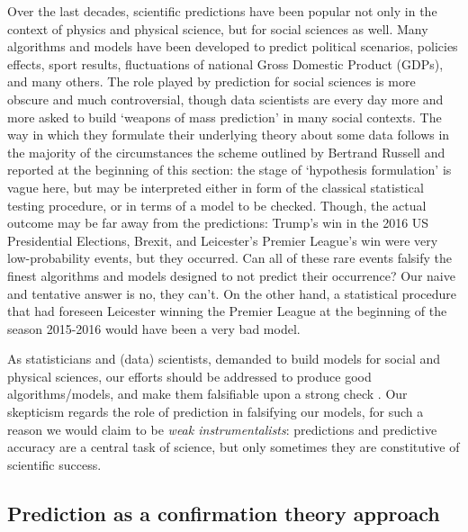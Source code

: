 \documentclass{statsoc}
\begin{document}
Over the last decades, scientific predictions have been popular not only in the context of physics and physical science, but for social sciences as well. Many algorithms and models 
have been developed to predict political scenarios, policies effects, sport results, fluctuations of national Gross Domestic Product (GDPs), and many others. The role played by 
prediction for social sciences is more obscure \citep{popper1944poverty, popper1945poverty} and much controversial, though data scientists are every day more and more asked to build 
`weapons of mass prediction' in many social contexts. The way in which they formulate their underlying theory about some data follows in the majority of the circumstances the scheme 
outlined by Bertrand Russell and reported at the beginning of this section: the stage of `hypothesis formulation' is vague here, but may be interpreted either in form of the 
classical statistical testing procedure, or in terms of a model to be checked. Though, the actual outcome may be far away from the predictions: Trump's win in the 2016 US 
Presidential Elections, Brexit, and Leicester's Premier League's win were very low-probability events, but they occurred. Can all of these rare events falsify the finest algorithms and models designed to not predict their occurrence? Our naive and tentative answer is no, they can't. On the other hand, a statistical procedure that had foreseen Leicester winning the Premier League at the beginning of the season 2015-2016 would have been a very bad model.

As statisticians and (data) scientists, demanded to build models for social and physical sciences, our efforts should be addressed to produce good algorithms/models, and make them falsifiable upon a strong check \citep{gelman2013philosophy}. Our skepticism regards the role of prediction in falsifying our models, for such a reason we would claim to be \emph{weak instrumentalists}: predictions and predictive accuracy are a central task of science, but only sometimes they are constitutive of scientific success.


\subsection{Prediction as a confirmation theory approach}

\end{document}
